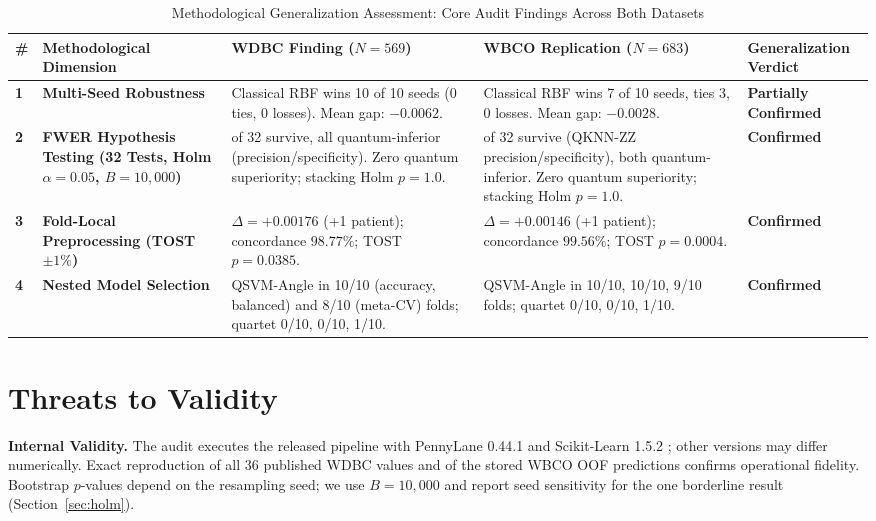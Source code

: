 \documentclass[journal,twocolumn]{IEEEtran}
\begin{document}
\begin{table}[!t]
\caption{Methodological Generalization Assessment: Core Audit Findings Across Both Datasets}
\label{tab:generalization}
\centering
\footnotesize
\renewcommand{\arraystretch}{1.25}
\begin{tabularx}{\textwidth}{>{\centering\arraybackslash\bfseries}p{0.5cm} >{\raggedright\arraybackslash\bfseries}p{3.2cm} >{\raggedright\arraybackslash}p{3.8cm} >{\raggedright\arraybackslash}X >{\centering\arraybackslash\bfseries}p{2.3cm}}
\toprule
\# & Methodological Dimension & WDBC Finding ($N=569$) & WBCO Replication ($N=683$) & Generalization Verdict \\
\midrule
1 & Multi-Seed Robustness & Classical RBF wins 10 of 10 seeds (0 ties, 0 losses). Mean gap: $-0.0062$. & Classical RBF wins 7 of 10 seeds, ties 3, 0 losses. Mean gap: $-0.0028$. & \textbf{Partially Confirmed} \\
\midrule
2 & FWER Hypothesis Testing (32 Tests, Holm $\alpha = 0.05$, $B=10{,}000$) & 8 of 32 survive, all quantum-inferior (precision/specificity). Zero quantum superiority; stacking Holm $p=1.0$. & 2 of 32 survive (QKNN-ZZ precision/specificity), both quantum-inferior. Zero quantum superiority; stacking Holm $p=1.0$. & \textbf{Confirmed} \\
\midrule
3 & Fold-Local Preprocessing (TOST $\pm 1\%$) & $\Delta=+0.00176$ (+1 patient); concordance $98.77\%$; TOST $p = 0.0385$. & $\Delta=+0.00146$ (+1 patient); concordance $99.56\%$; TOST $p = 0.0004$. & \textbf{Confirmed} \\
\midrule
4 & Nested Model Selection & QSVM-Angle in 10/10 (accuracy, balanced) and 8/10 (meta-CV) folds; quartet 0/10, 0/10, 1/10. & QSVM-Angle in 10/10, 10/10, 9/10 folds; quartet 0/10, 0/10, 1/10. & \textbf{Confirmed} \\
\bottomrule
\end{tabularx}
\end{table}

\section{Threats to Validity}
\label{sec:threats}

\textbf{Internal Validity.} The audit executes the released pipeline with PennyLane 0.44.1 \cite{bergholm2018pennylane} and Scikit-Learn 1.5.2 \cite{pedregosa2011sklearn}; other versions may differ numerically. Exact reproduction of all 36 published WDBC values and of the stored WBCO OOF predictions confirms operational fidelity. Bootstrap $p$-values depend on the resampling seed; we use $B=10{,}000$ and report seed sensitivity for the one borderline result (Section~\ref{sec:holm}).
\end{document}
